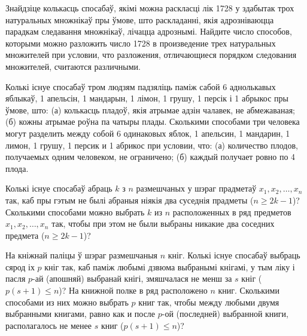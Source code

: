 \begin{problemList}
\smallskip

\problemItemSimple
{Знайдзіце колькасць спосабаў, якімі можна раскласці лік 1728 у здабытак
трох натуральных множнікаў пры ўмове, што раскладанні, якія адрозніваюцца парадкам
следавання множнікаў, лічацца адрознымі.}
{Найдите число способов, которыми можно разложить число 1728 в
произведение трех натуральных множителей при условии, что разложения,
отличающиеся порядком следования множителей, считаются различными.}

\bigskip

\problemItemSimple
{Колькі існуе спосабаў тром людзям падзяліць паміж сабой 6 аднолькавых яблыкаў,
1 апельсін, 1 мандарын, 1 лімон, 1 грушу, 1 персік і 1 абрыкос пры ўмове, што:
(а) колькасць пладоў, якія атрымае адзін чалавек, не абмежаваная; (б) кожны атрымае
роўна па чатыры плады.}
{Сколькими способами три человека могут разделить между собой 6
одинаковых яблок, 1 апельсин, 1 мандарин, 1 лимон, 1 грушу, 1 персик
и 1 абрикос при условии, что: (а) количество плодов, получаемых одним
человеком, не ограничено; (б) каждый получает ровно по 4 плода.}

\bigskip

\problemItemSimple
{Колькі існуе спосабаў абраць $k$ з $n$ размешчаных у шэраг прадметаў
$x_1, x_2, \dots, x_n$ так, каб пры гэтым не былі абраныя ніякія два
суседнія прадметы ($n \ge 2k - 1$)?}
{Сколькими способами можно выбрать $k$ из $n$ расположенных в ряд
предметов $x_1, x_2, \dots, x_n$ так, чтобы при этом не были выбраны
никакие два соседних предмета ($n \ge 2k - 1$)?}

\bigskip

\problemItemSimple
{На кніжнай паліцы ў шэраг размешчаныя $n$ кніг. Колькі існуе спосабаў выбраць
сярод іх $p$ кніг так, каб паміж любымі дзвюма выбранымі кнігамі, у тым ліку
і пасля $p$-ай (апошняй) выбранай кнігі, змяшчалася не менш за $s$ кніг
($p(s + 1) \le n$)?}
{На книжной полке в ряд расположено $n$ книг. Сколькими способами из
них можно выбрать $p$ книг так, чтобы между любыми двумя выбранными
книгами, равно как и после $p$-ой (последней) выбранной книги,
располагалось не менее $s$ книг ($p(s + 1) \le n$)?}

\end{problemList}


